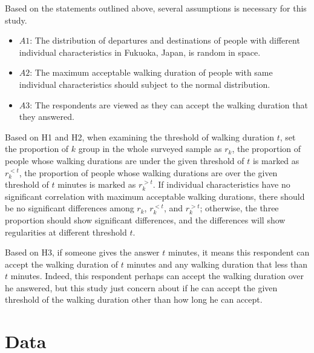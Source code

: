 \documentclass[Journal,letterpaper]{ascelike-new}
\begin{document}
%
Based on the statements outlined above, several assumptions is necessary for this study.
\begin{itemize}
	\item $A1$: The distribution of departures and destinations of people with different individual characteristics in Fukuoka, Japan, is random in space. 
	
	\item $A2$: The maximum acceptable walking duration of people with same individual characteristics should subject to the normal distribution. 
	
	\item $A3$: The respondents are viewed as they can accept the walking duration that they answered.
\end{itemize}

%
Based on H1 and H2, when examining the threshold of walking duration $t$, set the proportion of $k$ group in the whole surveyed sample as $r_k$, the proportion of people whose walking durations are under the given threshold of $t$ is marked as $r_{k}^{<t}$, the proportion of people whose walking durations are over the given threshold of $t$ minutes is marked as $r_{k}^{>t}$. If individual characteristics have no significant correlation with maximum acceptable walking durations, there should be no significant differences among $r_k$, $r_{k}^{<t}$, and $r_{k}^{>t}$; otherwise, the three proportion should show significant differences, and the differences will show regularities at different threshold $t$.

%
Based on H3, if someone gives the answer $t$ minutes, it means this respondent can accept the walking duration of $t$ minutes and any walking duration that less than $t$ minutes. Indeed, this respondent perhaps can accept the walking duration over he answered, but this study just concern about if he can accept the given threshold of the walking duration other than how long he can accept.

%
\section{Data}
%
\end{document}
